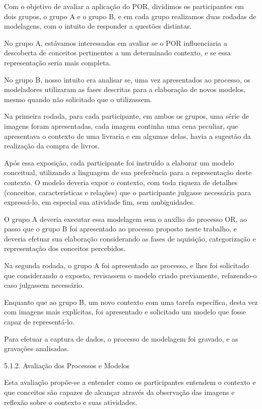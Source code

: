 Com o objetivo de avaliar a aplicação do POR, dividimos os participantes em dois grupos, o grupo A e o grupo B, e em cada grupo realizamos duas rodadas de modelagens, com o intuito de responder a questões distintas.

No grupo A, estávamos interessados em avaliar se o POR influenciaria a descoberta de conceitos pertinentes a um determinado contexto, e se essa representação seria mais completa.

No grupo B, nosso intuito era analisar se, uma vez apresentados ao processo, os modeladores utilizaram as fases descritas para a elaboração de novos modelos, mesmo quando não solicitado que o utilizassem.

Na primeira rodada, para cada participante, em ambos os grupos, uma série de imagens foram apresentadas, cada imagem continha uma cena peculiar, que apresentava o contexto de uma livraria e em algumas delas, havia a sugestão da realização da compra de livros.

Após essa exposição, cada participante foi instruído a elaborar um modelo conceitual, utilizando a linguagem de sua preferência para a representação deste contexto. O modelo deveria expor o contexto, com toda riqueza de detalhes (conceitos, características e relações) que o participante julgasse necessária para expressá-lo, em especial sua atividade fim, sem ambiguidades.

O grupo A deveria executar essa modelagem sem o auxílio do processo OR, ao passo que o grupo B foi apresentado ao processo proposto neste trabalho, e deveria efetuar sua elaboração considerando as fases de aquisição, categorização e representação dos conceitos percebidos.

Na segunda rodada, o grupo A foi apresentado ao processo, e lhes foi solicitado que considerando o exposto, revisassem o modelo criado previamente, refazendo-o caso julgassem necessário.

Enquanto que ao grupo B, um novo contexto com uma tarefa específica, desta vez com imagens mais explícitas, foi apresentado e solicitado um modelo que fosse capaz de representá-lo.

Para efetuar a captura de dados, o processo de modelagem foi gravado, e as gravações analisadas.

5.1.2. Avaliação dos Processos e Modelos

Esta avaliação propõe-se a entender como os participantes entendem o contexto e que conceitos são capazes de alcançar através da observação das imagens e reflexão sobre o contexto e suas atividades.


